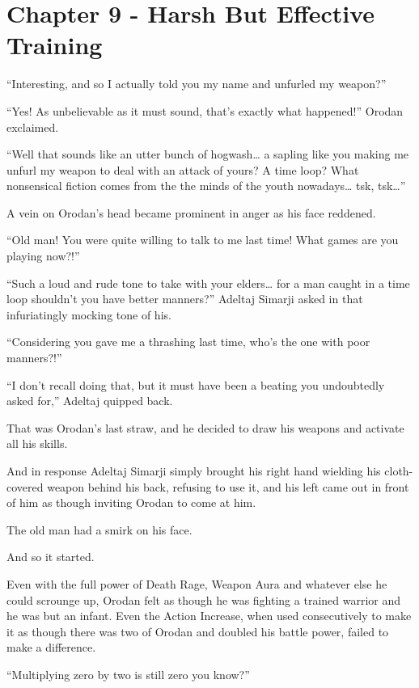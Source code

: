 \documentclass[a4paper,10pt]{book}
\begin{document}
\section*{Chapter 9 - Harsh But Effective Training}
%
\par
“Interesting, and so I actually told you my name and unfurled my weapon?”\par
“Yes! As unbelievable as it must sound, that’s exactly what happened!” Orodan exclaimed.\par
“Well that sounds like an utter bunch of hogwash… a sapling like you making me unfurl my weapon to deal with an attack of yours? A time loop? What nonsensical fiction comes from the the minds of the youth nowadays… tsk, tsk…”\par
A vein on Orodan’s head became prominent in anger as his face reddened.\par
“Old man! You were quite willing to talk to me last time! What games are you playing now?!”\par
“Such a loud and rude tone to take with your elders… for a man caught in a time loop shouldn’t you have better manners?” Adeltaj Simarji asked in that infuriatingly mocking tone of his.\par
“Considering you gave me a thrashing last time, who’s the one with poor manners?!”\par
“I don’t recall doing that, but it must have been a beating you undoubtedly asked for,” Adeltaj quipped back.\par
That was Orodan’s last straw, and he decided to draw his weapons and activate all his skills.\par
And in response Adeltaj Simarji simply brought his right hand wielding his cloth-covered weapon behind his back, refusing to use it, and his left came out in front of him as though inviting Orodan to come at him.\par
The old man had a smirk on his face.\par
And so it started.\par
Even with the full power of Death Rage, Weapon Aura and whatever else he could scrounge up, Orodan felt as though he was fighting a trained warrior and he was but an infant. Even the Action Increase, when used consecutively to make it as though there was two of Orodan and doubled his battle power, failed to make a difference.\par
“Multiplying zero by two is still zero you know?”\par
\end{document}
